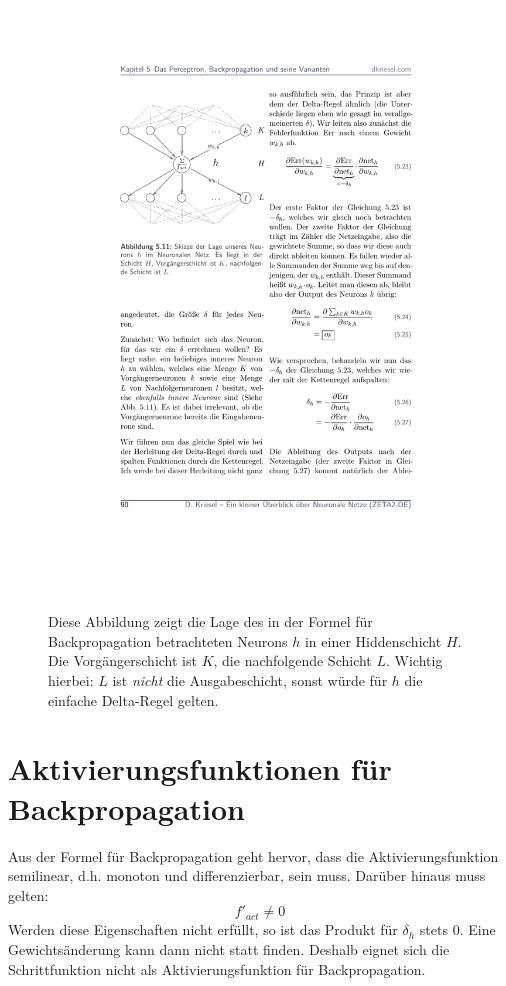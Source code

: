 \begin{figure}[ht!] \centering 
	\includegraphics[width=\linewidth]{figures/ch03_mlp-backpropagation.pdf}
	\caption{Diese Abbildung zeigt die Lage des in der Formel für Backpropagation betrachteten Neurons $h$ in einer Hiddenschicht $H$. Die Vorgängerschicht ist $K$, die nachfolgende Schicht $L$. Wichtig hierbei: $L$ ist \emph{nicht} die Ausgabeschicht, sonst würde für $h$ die einfache Delta-Regel gelten.}
	\label{fig:ch03_fehlerflaeche}
\end{figure}



\section*{Aktivierungsfunktionen für Backpropagation}
Aus der Formel für Backpropagation geht hervor, dass die Aktivierungsfunktion semilinear, d.h. monoton und differenzierbar, sein muss. Darüber hinaus muss gelten:
\[
	f'_{act} \ne 0
\]
Werden diese Eigenschaften nicht erfüllt, so ist das Produkt für $\delta_h$ stets $0$. Eine Gewichtsänderung kann dann nicht statt finden. Deshalb eignet sich die Schrittfunktion nicht als Aktivierungsfunktion für Backpropagation.

